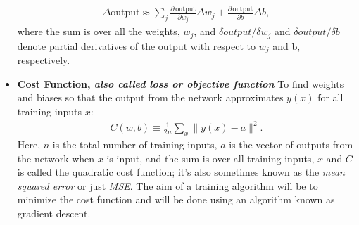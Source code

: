 \documentclass[a4paper, oneside,11pt]{article}
\begin{document}
\begin{itemize}
		\begin{eqnarray} 
		  \Delta \mbox{output} \approx \sum_j \frac{\partial \, \mbox{output}}{\partial w_j}
  		  \Delta w_j + \frac{\partial \, \mbox{output}}{\partial b} \Delta b,
		\end{eqnarray}
		where the sum is over all the weights, \begin{math}w_j\end{math}, and \begin{math}\delta output/\delta w_j\end{math} and \begin{math}\delta output/\delta b\end{math} denote partial derivatives of the output with respect to \begin{math}w_j\end{math} and b, respectively.

	\item \textbf{Cost Function, \textit{also called loss or objective function}}
		To find weights and biases so that the output from the network approximates \begin{math}y(x)\end{math} for all training inputs \begin{math}x\end{math}:
		\begin{eqnarray}  C(w,b) \equiv
		  \frac{1}{2n} \sum_x \| y(x) - a\|^2.
		\end{eqnarray}
		Here, \begin{math}n\end{math}  is the total number of training inputs, \begin{math}a\end{math} is the vector of outputs from the network when \begin{math}x\end{math} is input, and the sum is over all training inputs, \begin{math}x\end{math} and \begin{math}C\end{math}  is called the quadratic cost function; it's also sometimes known as the \textit{mean squared error} or just \textit{MSE}.
		The aim of a training algorithm will be to minimize the cost function and will be done using an algorithm known as gradient descent.		


\end{itemize}
\end{document}
